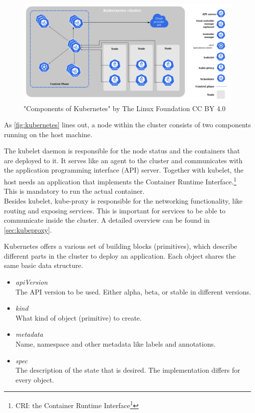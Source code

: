 \begin{figure}[H]
    \centering
    \includegraphics[width=1\linewidth]{media/02/kubernetes}
    \caption{"Components of Kubernetes" by The Linux Foundation CC BY 4.0}
    \label{fig:kubernetes}
\end{figure}

As \autoref{fig:kubernetes} lines out, a node within the cluster consists of two components running on the host machine.

The kubelet daemon is responsible for the node status and the containers that are deployed to it.
It serves like an agent to the cluster and communicates with the application programming interface (API) server.
Together with kubelet, the host needs an application that implements the Container Runtime Interface.\footnote{CRI: the Container Runtime Interface\footcite{CRI}}
This is mandatory to run the actual container.
\\
Besides kubelet, kube-proxy is responsible for the networking functionality, like routing and exposing services.
This is important for services to be able to communicate inside the cluster.
A detailed overview can be found in \autoref{sec:kubeproxy}.\cite{KUBERNETES-COMPONENTS}
\\
\newpage

Kubernetes offers a various set of building blocks (primitives), which describe different parts in the cluster to deploy an application.
Each object shares the same basic data structure.

\begin{itemize}
    \item \textit{apiVersion} \\
    The API version to be used.
    Either alpha, beta, or stable in different versions.
    \item \textit{kind} \\
    What kind of object (primitive) to create.
    \item \textit{metadata} \\
    Name, namespace and other metadata like labels and annotations.
    \item \textit{spec} \\
    The description of the state that is desired.
    The implementation differs for every object.
\end{itemize}


